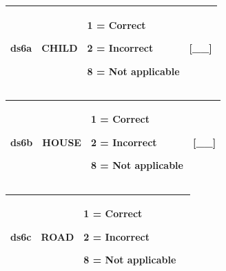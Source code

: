 \documentclass[12pt,a4paper]{book}
\theoremstyle{definition}
\theoremstyle{definition}
\theoremstyle{definition}
\theoremstyle{remark}
\begin{document}
\begin{longtable}[]{@{}llll@{}}
\toprule
\begin{minipage}[t]{0.24\columnwidth}\raggedright
ds6a\strut
\end{minipage} & \begin{minipage}[t]{0.24\columnwidth}\raggedright
CHILD\strut
\end{minipage} & \begin{minipage}[t]{0.24\columnwidth}\raggedright
1 = Correct

2 = Incorrect

8 = Not applicable\strut
\end{minipage} & \begin{minipage}[t]{0.24\columnwidth}\raggedright
{[}\_\_{]}\strut
\end{minipage}\tabularnewline
\bottomrule
\end{longtable}

\begin{longtable}[]{@{}llll@{}}
\toprule
\begin{minipage}[t]{0.24\columnwidth}\raggedright
ds6b\strut
\end{minipage} & \begin{minipage}[t]{0.24\columnwidth}\raggedright
HOUSE\strut
\end{minipage} & \begin{minipage}[t]{0.24\columnwidth}\raggedright
1 = Correct

2 = Incorrect

8 = Not applicable\strut
\end{minipage} & \begin{minipage}[t]{0.24\columnwidth}\raggedright
{[}\_\_{]}\strut
\end{minipage}\tabularnewline
\bottomrule
\end{longtable}

\begin{longtable}[]{@{}llll@{}}
\toprule
\begin{minipage}[t]{0.24\columnwidth}\raggedright
ds6c\strut
\end{minipage} & \begin{minipage}[t]{0.24\columnwidth}\raggedright
ROAD\strut
\end{minipage} & \begin{minipage}[t]{0.24\columnwidth}\raggedright
1 = Correct

2 = Incorrect

8 = Not applicable\strut
\end{minipage} & \begin{minipage}[t]{0.24\columnwidth}\raggedright
\strut
\end{minipage}\tabularnewline
\bottomrule
\end{longtable}
\end{document}
